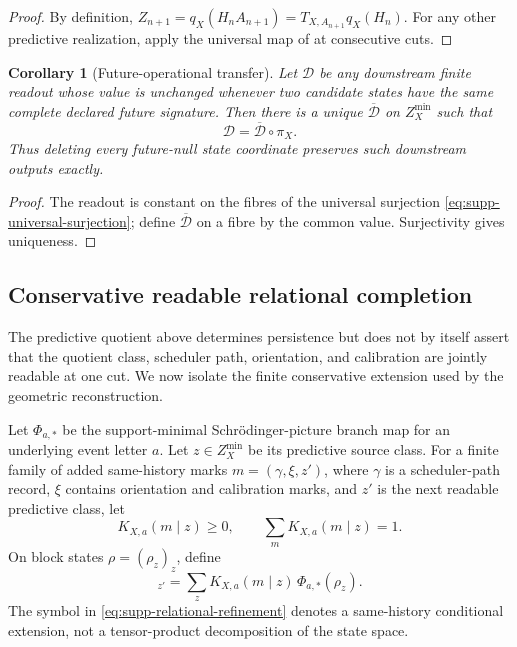 \documentclass[11pt]{article}
\numberwithin{equation}{section}
\newtheorem{corollary}[corollary]{Corollary}
\theoremstyle{definition}
\theoremstyle{remark}
\begin{document}
\begin{proof}
By definition,
$Z_{n+1}=q_X(H_nA_{n+1})=T_{X,A_{n+1}}q_X(H_n)$.  For any other predictive
realization, apply the universal map of
 at consecutive cuts.
\end{proof}

\begin{corollary}[Future-operational transfer]
\label{cor:supp-future-operational-transfer}
Let $\mathcal D$ be any downstream finite readout whose value is unchanged
whenever two candidate states have the same complete declared future
signature.  Then there is a unique $\overline{\mathcal D}$ on
$Z_X^{\min}$ such that
\begin{equation}
 \mathcal D=\overline{\mathcal D}\circ\pi_X.
 \label{eq:supp-compiler-factorization}
\end{equation}
Thus deleting every future-null state coordinate preserves such downstream
outputs exactly.
\end{corollary}

\begin{proof}
The readout is constant on the fibres of the universal surjection
\eqref{eq:supp-universal-surjection}; define $\overline{\mathcal D}$ on a
fibre by the common value.  Surjectivity gives uniqueness.
\end{proof}

\subsection{Conservative readable relational completion}
\label{supp:readable-relational-completion}

The predictive quotient above determines persistence but does not by itself
assert that the quotient class, scheduler path, orientation, and calibration
are jointly readable at one cut.  We now isolate the finite conservative
extension used by the geometric reconstruction.

Let $\Phi_{a,*}$ be the support-minimal Schr\"odinger-picture branch map for an
underlying event letter $a$.  Let $z\in Z_X^{\min}$ be its predictive source
class.  For a finite family of added same-history marks $m=(\gamma,\xi,z')$,
where $\gamma$ is a scheduler-path record, $\xi$ contains orientation and
calibration marks, and $z'$ is the next readable predictive class, let
\begin{equation}
 K_{X,a}(m\mid z)\ge0,
 \qquad
 \sum_m K_{X,a}(m\mid z)=1.
 \label{eq:supp-relational-kernel}
\end{equation}
On block states $\rho=(\rho_z)_z$, define
\begin{equation}
 [\widetilde\Phi_{a,m,*}(\rho)]_{z'}
 =\sum_z K_{X,a}(m\mid z)\,\Phi_{a,*}(\rho_z).
 \label{eq:supp-relational-refinement}
\end{equation}
The symbol in \eqref{eq:supp-relational-refinement} denotes a same-history
conditional extension, not a tensor-product decomposition of the state space.
\end{document}
